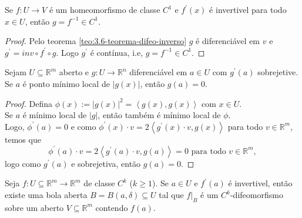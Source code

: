\begin{corollary}
  Se $f:U\to V$ é um homeomorfismo de classe $C^{1}$ e $f^{\prime}(x)$ é invertivel para todo $x\in U$, então $g=f^{-1}\in C^{1}$. 
\end{corollary}
\begin{proof} 
  Pelo teorema \ref{teo:3.6-teorema-difeo-inverso} $g$ é diferenciável em $v$ e $g^{\prime}=inv\circ f^{\prime}\circ g$. Logo $g^{\prime}$ é contínua, i.e, $g=f^{-1}\in C^{1}$. 
\end{proof}
\begin{lemma}\label{lema:3.6-lema1}
  Sejam $U\subseteq \mathbb{R}^{m}$ aberto e $g:U\to\mathbb{R}^{n}$ diferenciável em $a\in U$ com $g^{\prime}(a)$ sobrejetive. Se $a$ é ponto mínimo local de $|g(x)|$, então $g(a)=0$.
\end{lemma}
\begin{proof} 
  Defina $\phi(x):=|g(x)|^{2}=\left\langle 
  g(x),g(x)\right\rangle$ com $x\in U$.\\
  Se $a$ é mínimo local de $|g|$, então também é mínimo local de $\phi$.\\
  Logo, $\phi^{\prime}(a)=0$ e como $\phi^{\prime}(x)\cdot v=2\left\langle g^{\prime}(x)\cdot v,g(x) \right\rangle$ para todo $v\in\mathbb{R}^{m}$, temos que 
  $$\phi^{\prime}(a)\cdot v=2\left\langle g^{\prime}(a)\cdot v,g(a) \right\rangle=0\text{ para todo }v\in\mathbb{R}^{m},$$
  logo como $g^{\prime}(a)$ e sobrejetiva, então $g(a)=0$. 
\end{proof}
\begin{theorem}
  Seja $f:U\subseteq \mathbb{R}^{m}\to\mathbb{R}^{m}$ de classe $C^{k}$ ($k\geq 1$). Se $a\in U$ e $f^{\prime}(a)$ é invertivel, então existe uma bola aberta $B=B(a,\delta)\subseteq U$ tal que $f\big|_{B}$ é um $C^{k}$-difeomorfismo sobre um aberto $V\subseteq\mathbb{R}^{m}$ contendo $f(a)$. 
\end{theorem}

